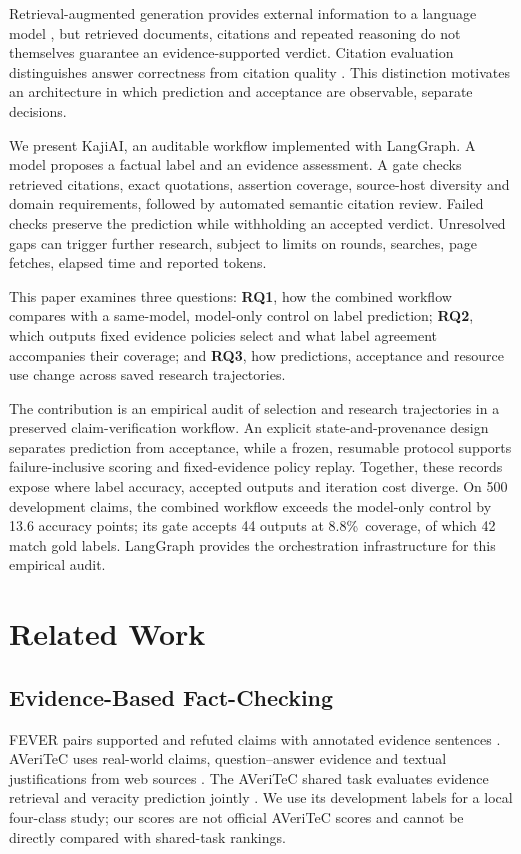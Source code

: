 \documentclass[conference]{IEEEtran}
\newcommand{\pct}{\%}
\begin{document}
Retrieval-augmented generation provides external information to a language model \cite{rag}, but retrieved documents, citations and repeated reasoning do not themselves guarantee an evidence-supported verdict. Citation evaluation distinguishes answer correctness from citation quality \cite{alce}. This distinction motivates an architecture in which prediction and acceptance are observable, separate decisions.

We present KajiAI, an auditable workflow implemented with LangGraph. A model proposes a factual label and an evidence assessment. A gate checks retrieved citations, exact quotations, assertion coverage, source-host diversity and domain requirements, followed by automated semantic citation review. Failed checks preserve the prediction while withholding an accepted verdict. Unresolved gaps can trigger further research, subject to limits on rounds, searches, page fetches, elapsed time and reported tokens.

This paper examines three questions: \textbf{RQ1}, how the combined workflow compares with a same-model, model-only control on label prediction; \textbf{RQ2}, which outputs fixed evidence policies select and what label agreement accompanies their coverage; and \textbf{RQ3}, how predictions, acceptance and resource use change across saved research trajectories.

The contribution is an empirical audit of selection and research trajectories in a preserved claim-verification workflow. An explicit state-and-provenance design separates prediction from acceptance, while a frozen, resumable protocol supports failure-inclusive scoring and fixed-evidence policy replay. Together, these records expose where label accuracy, accepted outputs and iteration cost diverge. On 500 development claims, the combined workflow exceeds the model-only control by 13.6 accuracy points; its gate accepts 44 outputs at 8.8\pct\ coverage, of which 42 match gold labels. LangGraph provides the orchestration infrastructure for this empirical audit.

\section{Related Work}
\subsection{Evidence-Based Fact-Checking}
FEVER pairs supported and refuted claims with annotated evidence sentences \cite{fever}. AVeriTeC uses real-world claims, question--answer evidence and textual justifications from web sources \cite{averitec}. The AVeriTeC shared task evaluates evidence retrieval and veracity prediction jointly \cite{sharedtask}. We use its development labels for a local four-class study; our scores are not official AVeriTeC scores and cannot be directly compared with shared-task rankings.
\end{document}
